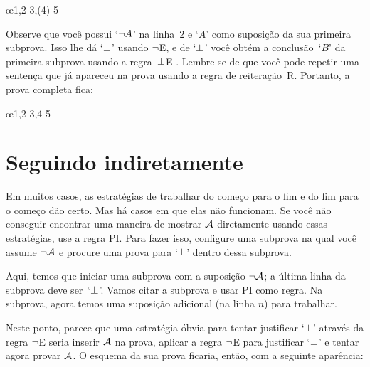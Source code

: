 \begin{fitchproof}
	\open
	\ellipsesline 
	\close 
	\open
	\ellipsesline
	\close
	\oe{1,2-3,(4)-5} 
\end{fitchproof} 
Observe que você possui   `$\neg A$' na linha~$2$ e `$A$' como suposição da sua primeira subprova. Isso lhe dá  `$\bot$'  usando $\neg$E, e de `$\bot$' você obtém a conclusão~`$B$' da primeira subprova usando a regra~$\bot$E . Lembre-se de que você pode repetir uma sentença que já apareceu na prova  usando a regra de reiteração~R. Portanto, a prova completa fica:
\begin{fitchproof}
	\open
	\close 
	\open
	\close
	\oe{1,2-3,4-5} 
\end{fitchproof} 
\section{Seguindo indiretamente}

Em muitos casos, as estratégias de trabalhar do começo para o fim  e do fim para o começo dão certo. Mas há casos em que elas não funcionam. Se você não conseguir encontrar uma maneira de mostrar $\mathcal{A}$ diretamente usando essas estratégias,  use a regra PI. Para fazer isso, configure uma subprova na qual você assume  $\neg\mathcal{A}$  e procure uma prova para `$\bot$' dentro dessa subprova.

\begin{fitchproof}
\open
{}
\ellipsesline 
{}
\close
{}
\end{fitchproof}
Aqui, temos que iniciar uma subprova com a suposição $\neg \mathcal{A}$;
a última linha da subprova deve ser~`$\bot$'. Vamos citar a subprova e usar  PI como regra. Na subprova, agora temos uma suposição adicional (na linha $n$) para trabalhar.
 

Neste ponto, parece que uma estratégia óbvia para tentar justificar  `$\bot$' através da regra $\neg$E seria inserir $\mathcal{A}$ na prova, aplicar a regra $\neg$E para justificar  `$\bot$' e tentar agora provar $\mathcal{A}$. O esquema da sua prova ficaria, então, com a seguinte aparência:


\begin{fitchproof}
\open
{}
\ellipsesline
{}
\close
{}
\end{fitchproof} 

